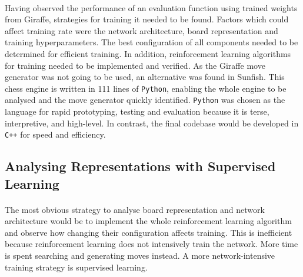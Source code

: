 \documentclass[12pt,a4paper]{book}
\begin{document}
\paragraph{} Having observed the performance of an evaluation function using trained weights from Giraffe, strategies for training it needed to be found. Factors which could affect training rate were the network architecture, board representation and training hyperparameters. The best configuration of all components needed to be determined for efficient training. In addition, reinforcement learning algorithms for training needed to be implemented and verified. As the Giraffe move generator was not going to be used, an alternative was found in Sunfish. This chess engine is written in 111 lines of \texttt{Python}, enabling the whole engine to be analysed and the move generator quickly identified. \cite{sunfish} \texttt{Python} was chosen as the language for rapid prototyping, testing and evaluation because it is terse, interpretive, and high-level. In contrast, the final codebase would be developed in \texttt{C++} for speed and efficiency.


\subsection{Analysing Representations with Supervised Learning}

\paragraph{} The most obvious strategy to analyse board representation and network architecture would be to implement the whole reinforcement learning algorithm and observe how changing their configuration affects training. This is inefficient because reinforcement learning does not intensively train the network. More time is spent searching and generating moves instead. A more network-intensive training strategy is supervised learning.
\end{document}
